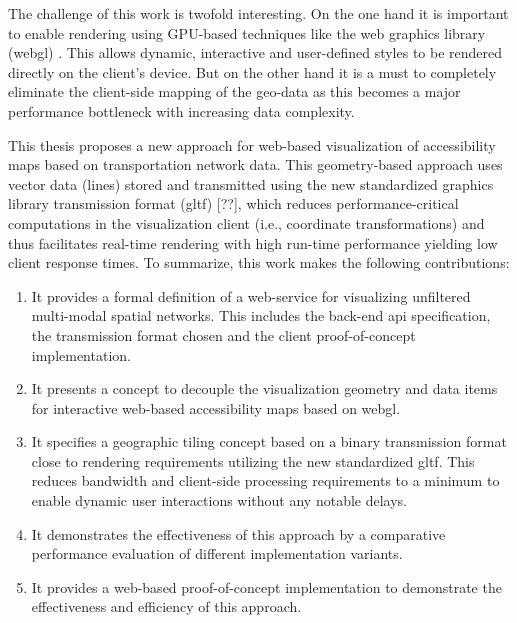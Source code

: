     The challenge of this work is twofold interesting. On the one hand it is
    important to enable rendering using GPU-based techniques like
    the web graphics library (\acrshort{webgl}) \cite{Jackson2016}.
    This allows dynamic, interactive and user-defined styles to be rendered
    directly on the client's device. But on the other hand it is a must to
    completely eliminate the client-side mapping of the geo-data as this becomes
    a major performance bottleneck with increasing data complexity.\par

    This thesis proposes a new approach for web-based visualization of
    accessibility maps based on transportation network data. This geometry-based
    approach uses vector data (lines) stored and transmitted using the new
    standardized graphics library transmission format (\acrshort{gltf}) [??],
    which reduces performance-critical
    computations in the visualization client (i.e., coordinate transformations)
    and thus facilitates real-time rendering with high run-time performance
    yielding low client response times. To summarize, this work makes the
    following contributions:\par

    \begin{enumerate}[\label=({C}1)]

      \item \label{enu:contr:c1} It provides a formal definition of a
        web-service for visualizing unfiltered multi-modal spatial networks.
        This includes the back-end \acrshort{api} specification, the
        transmission format chosen and the client proof-of-concept
        implementation.
      \item \label{enu:contr:c2} It presents a concept to decouple the
        visualization geometry and data items for interactive web-based
        accessibility maps based on \acrshort{webgl}.
      \item \label{enu:contr:c3} It specifies a geographic tiling concept based
        on a binary transmission format close to rendering requirements
        utilizing the new standardized \acrshort{gltf}. This reduces bandwidth
        and client-side processing requirements to a minimum to enable dynamic
        user interactions without any notable delays.
      \item \label{enu:contr:c4} It demonstrates the effectiveness of this
        approach by a comparative performance evaluation of different
        implementation variants.
      \item \label{enu:contr:c5} It provides a web-based proof-of-concept
        implementation to demonstrate the effectiveness and efficiency of this
        approach.
    \end{enumerate}

